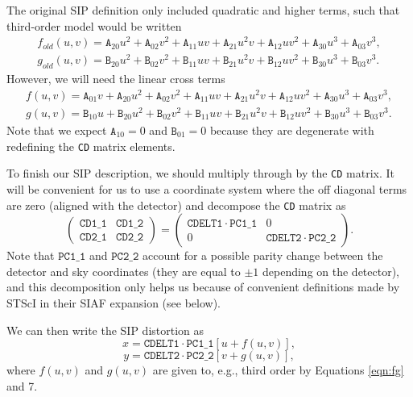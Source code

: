 \documentclass[10pt]{article}
\newcommand{\sipA}[2]{\ensuremath{\mathtt{A}_{#1 #2}}}
\newcommand{\sipB}[2]{\ensuremath{\mathtt{B}_{#1 #2}}}
\newcommand{\NCu}{\ensuremath{\mathtt{PC1\_1}}}
\newcommand{\NCv}{\ensuremath{\mathtt{PC2\_2}}}
\begin{document}
The original SIP definition only included quadratic and higher terms, such that third-order model would be written
\begin{eqnarray}
f_{old}(u,v) = \sipA{2}{0}u^2 + \sipA{0}{2}v^2 + \sipA{1}{1}uv + \sipA{2}{1}u^2 v + \sipA{1}{2}uv^2 + \sipA{3}{0}u^3 + \sipA{0}{3}v^3,\\
g_{old}(u,v) = \sipB{2}{0}u^2 + \sipB{0}{2}v^2 + \sipB{1}{1}uv + \sipB{2}{1}u^2 v + \sipB{1}{2}uv^2 + \sipB{3}{0}u^3 + \sipB{0}{3}v^3.
\end{eqnarray}
\noindent
However, we will need the linear cross terms
\begin{eqnarray}
\label{eqn:fg}
f(u,v) = \sipA{0}{1}v + \sipA{2}{0}u^2 + \sipA{0}{2}v^2 + \sipA{1}{1}uv + \sipA{2}{1}u^2 v + \sipA{1}{2}uv^2 + \sipA{3}{0}u^3 + \sipA{0}{3}v^3,\\
g(u,v) = \sipB{1}{0}u +\sipB{2}{0}u^2 + \sipB{0}{2}v^2 + \sipB{1}{1}uv + \sipB{2}{1}u^2 v + \sipB{1}{2}uv^2 + \sipB{3}{0}u^3 + \sipB{0}{3}v^3.
\end{eqnarray}
\noindent
Note that we expect $\sipA{1}{0}=0$ and $\sipB{0}{1}=0$ because they are degenerate with redefining the
{\tt CD} matrix elements.

To finish our SIP description, we should multiply through by the {\tt CD} matrix. It will be convenient
for us to use a coordinate system where the off diagonal terms are zero (aligned with the detector) and
decompose the {\tt CD} matrix as
\begin{equation}
\left(\begin{array}{cc} \mathtt{CD1\_1}&\mathtt{CD1\_2}\\\mathtt{CD2\_1}&\mathtt{CD2\_2}\end{array}\right) = 
\left(\begin{array}{cc} \mathtt{CDELT1} \cdot  \NCu & 0\\0 &\mathtt{CDELT2} \cdot \NCv \end{array}\right).
\end{equation}
\noindent
Note that $\NCu$ and $\NCv$ account for a possible parity change between the detector and sky coordinates (they are equal to $\pm1$ depending on the detector),
and this decomposition only helps us because of convenient definitions made by STScI in their SIAF expansion (see below).

We can then write the SIP distortion as
\begin{equation}
\label{eqn:sip_x}
x = \mathtt{CDELT1} \cdot  \NCu \left[u + f(u,v)\right],
\end{equation}
\noindent
\begin{equation}
\label{eqn:sip_y}
y = \mathtt{CDELT2} \cdot  \NCv \left[v + g(u,v)\right],
\end{equation}
\noindent
where $f(u,v)$ and $g(u,v)$ are given to, e.g., third order by Equations \ref{eqn:fg} and 7.
\end{document}
